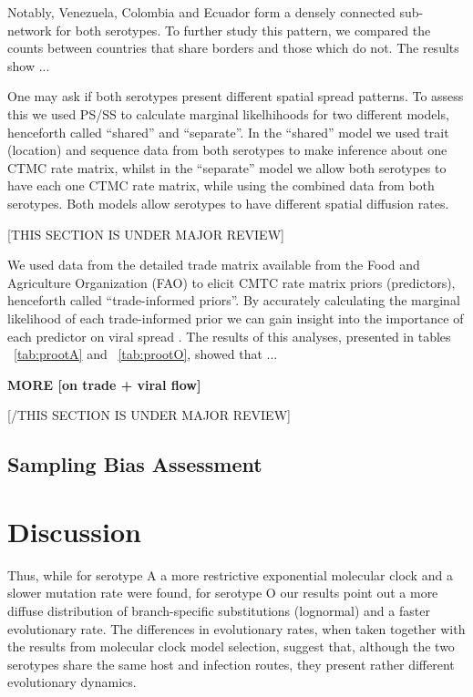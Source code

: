 \documentclass[10pt]{article}
\begin{document}
Notably, Venezuela, Colombia and Ecuador form a densely connected sub-network for both serotypes.
To further study this pattern, we compared the counts between countries that share borders and those which do not. The results show ... %

One may ask if both serotypes present different spatial spread patterns.
To assess this we used PS/SS to calculate marginal likelhihoods for two different models, henceforth  called ``shared'' and ``separate''.
In the ``shared'' model we used trait (location) and sequence data  from both serotypes to make inference about one CTMC rate matrix, whilst in the ``separate'' model we allow both serotypes to have each one CTMC rate matrix, while using the combined data from both serotypes.
Both models allow serotypes to have different spatial diffusion rates.


\begin{center}
 [THIS SECTION IS UNDER MAJOR REVIEW]
\end{center}

We used data from the detailed trade matrix available from the Food and Agriculture Organization (FAO) to elicit CMTC rate matrix priors (predictors), henceforth called ``trade-informed priors''.
By accurately calculating the marginal likelihood of each trade-informed prior we can gain insight into the importance of each predictor on viral spread \cite{Carvalho2012,Nelson2011}.
The results of this analyses, presented in tables ~\ref{tab:prootA} and ~\ref{tab:prootO}, showed that ... %

{{\bf MORE [on trade + viral flow]}}

\begin{center}
 [/THIS SECTION IS UNDER MAJOR REVIEW]
\end{center}

\subsection*{Sampling Bias Assessment}

\section*{Discussion}
Thus, while for serotype A a more restrictive exponential molecular clock and a slower mutation rate were found, for serotype O our results point out a more diffuse distribution of branch-specific substitutions (lognormal) and a faster evolutionary rate.
The differences in evolutionary rates, when taken together with the results from molecular clock model selection, suggest that, although the two serotypes share the same host and infection routes, they present rather different evolutionary dynamics. 
\end{document}
